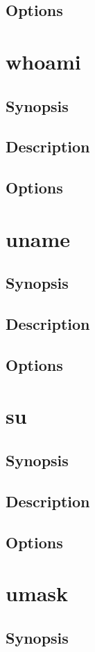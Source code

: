 \documentclass[a4paper, 10pt, onecolumn, openright, oneside]{book}
\begin{document}
			\subsection{Options}
		\section{whoami}
			\subsection{Synopsis}
			\subsection{Description}
			\subsection{Options}
		\section{uname}
			\subsection{Synopsis}
			\subsection{Description}
			\subsection{Options}
		\section{su}
			\subsection{Synopsis}
			\subsection{Description}
			\subsection{Options}
		\section{umask}
			\subsection{Synopsis}
\end{document}
